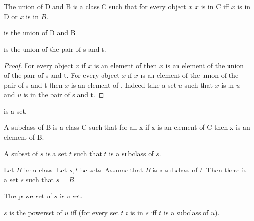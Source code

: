 \documentclass{article}
\begin{document}
\begin{forthel}
    \begin{definition}
      The union of D and B is a class C such that for every object $x$
        $x$ is in C iff $x$ is in D or $x$ is in $B$.
    \end{definition}

    \begin{definition}
       is the union of D and B.
    \end{definition}

    \begin{lemma}
       is the union of the pair of s and t.
    \end{lemma}
    \begin{proof}
      For every object $x$ if $x$ is an element of 
        then $x$ is an element of the union of the pair of s and t.
      For every object $x$ if $x$ is an element of the union of the pair of s and t
        then $x$ is an element of .
      Indeed take a set $u$ such that $x$ is in $u$ and $u$ is in the pair of s and t.
    \end{proof}

    \begin{lemma}
       is a set.
    \end{lemma}

    \begin{definition}
      A subclass of B is a class C such that
        for all x if x is an element of C then x is an element of B.
    \end{definition}

    \begin{definition}
      A subset of $s$ is a set $t$ 
        such that $t$ is a subclass of $s$.
    \end{definition}

    \begin{axiom}[Separation]
      Let $B$ be a class. Let $s, t$ be sets.
      Assume that $B$ is a subclass of $t$.
      Then there is a set $s$ such that $s = B$.
    \end{axiom}

    \begin{signature}
      The powerset of $s$ is a set.
    \end{signature}

    \begin{axiom}[PowerSet]
      $s$ is the powerset of $u$ iff (for every set $t$ $t$ is in $s$ iff $t$ is a subclass of $u$).
    \end{axiom}


\end{forthel}
\end{document}
